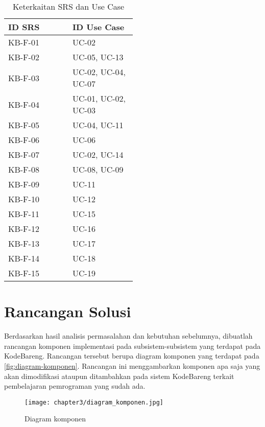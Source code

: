 \begin{longtable}[c]{|l|>{\setlength{\baselineskip}{0.75\baselineskip}}p{0.5\linewidth}|}
  \caption{Keterkaitan SRS dan Use Case}
  \label{tab:srs-usecase}                \\
  \hline
  \rowcolor{gray!30}
  \textbf{ID SRS} & \textbf{ID Use Case} \\ \hline
  \endfirsthead
  \endhead
  KB-F-01         & UC-02                \\ \hline
  KB-F-02         & UC-05, UC-13         \\ \hline
  KB-F-03         & UC-02, UC-04, UC-07  \\ \hline
  KB-F-04         & UC-01, UC-02, UC-03  \\ \hline
  KB-F-05         & UC-04, UC-11         \\ \hline
  KB-F-06         & UC-06                \\ \hline
  KB-F-07         & UC-02, UC-14         \\ \hline
  KB-F-08         & UC-08, UC-09         \\ \hline
  KB-F-09         & UC-11                \\ \hline
  KB-F-10         & UC-12                \\ \hline
  KB-F-11         & UC-15                \\ \hline
  KB-F-12         & UC-16                \\ \hline
  KB-F-13         & UC-17                \\ \hline
  KB-F-14         & UC-18                \\ \hline
  KB-F-15         & UC-19                \\ \hline
\end{longtable}

\section{Rancangan Solusi}

Berdasarkan hasil analisis permasalahan dan kebutuhan sebelumnya, dibuatlah rancangan komponen implementasi pada subsistem-subsistem yang terdapat pada KodeBareng. Rancangan tersebut berupa diagram komponen yang terdapat pada \autoref{fig:diagram-komponen}. Rancangan ini menggambarkan komponen apa saja yang akan dimodifikasi ataupun ditambahkan pada sistem KodeBareng terkait pembelajaran pemrograman yang sudah ada.

\begin{figure}[H]
  \centering
  \texttt{[image: chapter3/diagram\_komponen.jpg]}
  \caption{Diagram komponen} \label{fig:diagram-komponen}
\end{figure}

